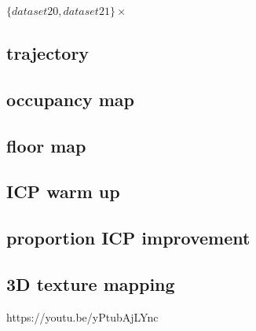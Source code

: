 \documentclass[conference]{IEEEtran}
\begin{document}
$\{dataset 20, dataset 21\}\times{}$

\subsection{trajectory}

\subsection{occupancy map}

\subsection{floor map}

\appendix
\subsection{ICP warm up}

\subsection{proportion ICP improvement}


\subsection{3D texture mapping}
https://youtu.be/yPtubAjLYnc
\end{document}

